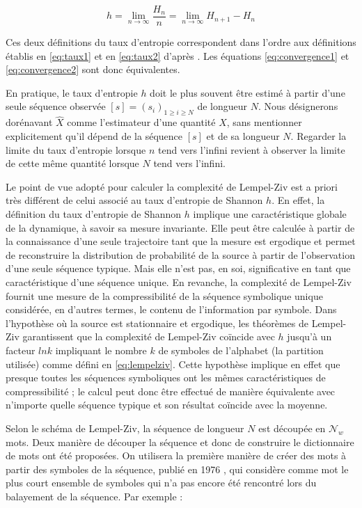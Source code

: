 \begin{equation}
    h = \lim_{n \to \infty}\frac{H_n}{n} = \lim_{n \to \infty}H_{n+1} - H_n \label{eq:convergence2}
\end{equation}

Ces deux définitions du taux d'entropie correspondent dans l'ordre aux définitions établis en \eqref{eq:taux1} et en \eqref{eq:taux2} d'après \cite{2}. Les équations \eqref{eq:convergence1} et \eqref{eq:convergence2} sont donc équivalentes.

\vspace{2ex}
En pratique, le taux d'entropie $h$ doit le plus souvent être estimé à partir d'une seule séquence observée $[s] = (s_i)_{1 \geq i \geq N}$ de longueur $N$. 
Nous désignerons dorénavant $\hat{X}$ comme l'estimateur d'une quantité $X$, sans mentionner explicitement qu'il dépend de la séquence $[s]$ et de sa longueur $N$. Regarder la limite du taux d'entropie lorsque $n$ tend vers l'infini revient à observer la limite de cette même quantité lorsque $N$ tend vers l'infini.

\vspace{2ex}
Le point de vue adopté pour calculer la complexité de Lempel-Ziv est a priori très différent de celui associé au taux d'entropie de Shannon $h$. En effet, la définition du taux d'entropie de Shannon $h$ implique une caractéristique globale de la dynamique, à savoir sa mesure invariante. Elle peut être calculée à partir de la connaissance d'une seule trajectoire tant que la mesure est ergodique et permet de reconstruire la distribution de probabilité de la source à partir de l'observation d'une seule séquence typique. Mais elle n'est pas, en soi, significative en tant que caractéristique d'une séquence unique. En revanche, la complexité de Lempel-Ziv fournit une mesure de la compressibilité de la séquence symbolique unique considérée, en d'autres termes, le contenu de l'information par symbole. Dans l'hypothèse où la source est stationnaire et ergodique, les théorèmes de Lempel-Ziv \cite{16} garantissent que la complexité de Lempel-Ziv coïncide avec $h$ jusqu'à un facteur $lnk$ impliquant le nombre $k$ de symboles de l'alphabet (la partition utilisée) comme défini en \eqref{eq:lempelziv}. Cette hypothèse implique en effet que presque toutes les séquences symboliques ont les mêmes caractéristiques de compressibilité ; le calcul peut donc être effectué de manière équivalente avec n'importe quelle séquence typique et son résultat coïncide avec la moyenne.

Selon le schéma de Lempel-Ziv, la séquence de longueur $N$ est découpée en $\mathcal{N}_w$ mots. Deux manière de découper la séquence et donc de construire le dictionnaire de mots ont été proposées. On utilisera la première manière de créer des mots à partir des symboles de la séquence, publié en 1976 \cite{15}, qui considère comme mot le plus court ensemble de symboles qui n'a pas encore été rencontré lors du balayement de la séquence. Par exemple :

